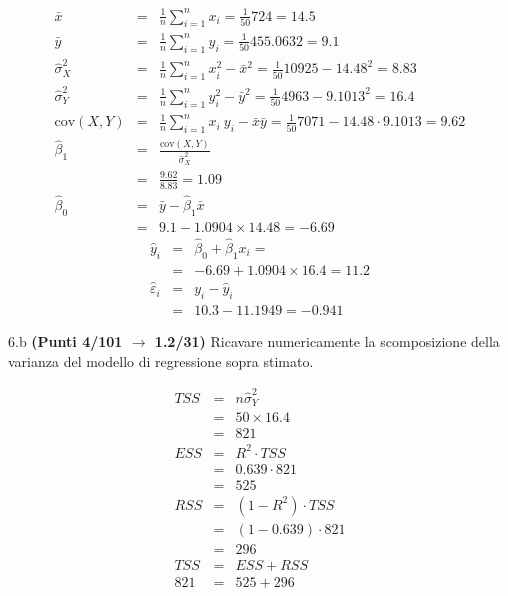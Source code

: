 \documentclass[
  11pt,
]{book}
\theoremstyle{mytheoremstyle}
\theoremstyle{mydefstyle}
\newenvironment{sol}
  {
  \begin{tcolorbox}[enhanced,breakable,arc=0.1mm,boxrule=1pt,colback=white,colframe=iblue,
  title=\bf \fontfamily{lmss}\selectfont \hspace{.5 cm} Soluzione,drop fuzzy shadow]

}{
\end{tcolorbox}
  }
\begin{document}
\begin{sol}
\begin{eqnarray*}
           \bar x &=&\frac 1 n\sum_{i=1}^n x_i = \frac {1}{ 50 }  724 =  14.5 \\
           \bar y &=&\frac 1 n\sum_{i=1}^n y_i = \frac {1}{ 50 }  455.0632 =  9.1 \\
           \hat\sigma_X^2&=&\frac 1 n\sum_{i=1}^n x_i^2-\bar x^2=\frac {1}{ 50 }  10925  - 14.48 ^2= 8.83 \\
           \hat\sigma_Y^2&=&\frac 1 n\sum_{i=1}^n y_i^2-\bar y^2=\frac {1}{ 50 }  4963  - 9.1013 ^2= 16.4 \\
           \text{cov}(X,Y)&=&\frac 1 n\sum_{i=1}^n x_i~y_i-\bar x\bar y=\frac {1}{ 50 }  7071 - 14.48 \cdot 9.1013 = 9.62 \\
           \hat\beta_1 &=& \frac{\text{cov}(X,Y)}{\hat\sigma_X^2} \\
                    &=& \frac{ 9.62 }{ 8.83 }  =  1.09 \\
           \hat\beta_0 &=& \bar y - \hat\beta_1 \bar x\\
                    &=&  9.1 - 1.0904 \times  14.48 = -6.69 
         \end{eqnarray*}\begin{eqnarray*}
\hat y_i &=&\hat\beta_0+\hat\beta_1 x_i=\\ 
&=& -6.69 + 1.0904 \times 16.4 = 11.2 \\ 
\hat \varepsilon_i &=& y_i-\hat y_i\\ 
&=& 10.3 - 11.1949 = -0.941  
\end{eqnarray*}

\end{sol}

6.b \textbf{(Punti 4/101 \(\rightarrow\) 1.2/31)} Ricavare numericamente la scomposizione della varianza del modello di regressione sopra stimato.

\begin{sol}
\begin{eqnarray*}
   TSS &=& n\hat\sigma^2_Y\\
      &=& 50 \times 16.4 \\
      &=&  821 \\
   ESS &=& R^2\cdot TSS\\
      &=&  0.639 \cdot 821 \\
      &=& 525 \\
   RSS &=& (1-R^2)\cdot TSS\\
      &=& (1- 0.639 )\cdot 821 \\
      &=&  296 \\
   TSS &=& ESS+RSS \\ 821  &=&  525 + 296 
  \end{eqnarray*}

\end{sol}
\end{document}

